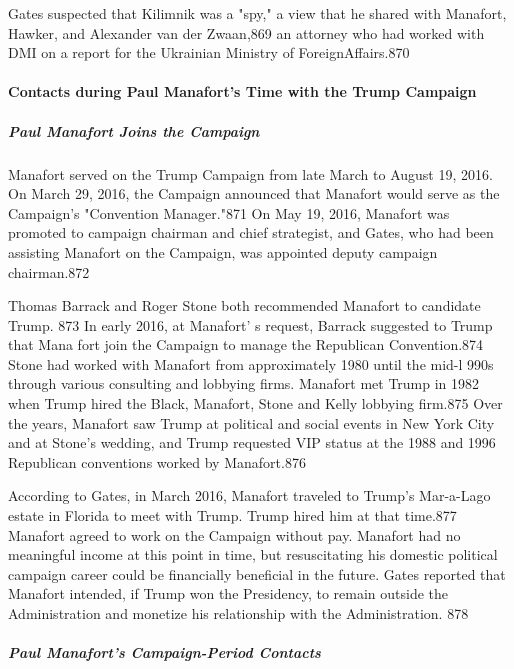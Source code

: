 Gates suspected that Kilimnik was a "spy," a view that he shared with Manafort, Hawker, and Alexander van der Zwaan,869 an attorney who had worked with DMI on a  report for the Ukrainian Ministry of ForeignAffairs.870

\paragraph{Contacts during Paul Manafort's Time with the Trump Campaign}

\subparagraph{Paul Manafort Joins the Campaign}

Manafort served on the Trump Campaign from late March to August 19, 2016. On March 29, 2016, the Campaign announced that Manafort would serve as the Campaign's "Convention Manager."871 On May 19, 2016,  Manafort was promoted to campaign chairman and chief strategist, and Gates, who had been assisting Manafort on the Campaign, was appointed deputy campaign chairman.872

Thomas Barrack and Roger Stone both recommended Manafort to candidate Trump. 873 In early 2016,  at Manafort' s  request, Barrack suggested to Trump that Mana fort join the Campaign to manage the Republican Convention.874 Stone had worked with Manafort from approximately 1980 until the mid-l 990s through various consulting and lobbying firms. Manafort met Trump in 1982 when Trump hired the Black, Manafort, Stone and Kelly lobbying firm.875 Over the years, Manafort saw Trump at political and social events in New York City and at Stone's wedding, and Trump requested VIP status at the 1988 and 1996 Republican conventions worked by Manafort.876

According to Gates, in March 2016, Manafort traveled to Trump's Mar-a-Lago estate in Florida to meet with Trump. Trump hired him at that time.877 Manafort agreed to work on the Campaign without pay. Manafort had no meaningful income at this point in time, but resuscitating his domestic political campaign career could be financially beneficial in the future. Gates reported that Manafort intended, if  Trump won the Presidency, to remain outside the Administration and monetize his relationship with the Administration. 878

\subparagraph{Paul Manafort's Campaign-Period Contacts}

